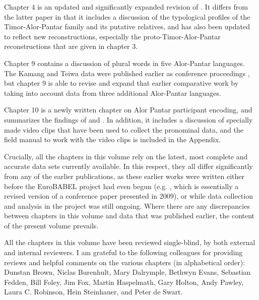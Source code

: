 \documentclass[output=paper]{LSP/langsci}
\begin{document}
	Chapter 4 is an updated and significantly expanded revision of \citet{RobinsonEtAl2012reassessing}. It differs from the latter paper in that it includes a discussion of the typological profiles of the Timor-Alor-Pantar family and its putative relatives, and has also been updated to reflect new reconstructions, especially the proto-Timor-Alor-Pantar reconstructions that are given in chapter 3. 
	
	Chapter 9 contains a discussion of plural words in five Alor-Pantar languages. The Kamang and Teiwa data were published earlier as conference proceedings \citep{SchapperEtAl2011plural}, but chapter 9 is able to revise and expand that earlier comparative work by taking into account data from three additional Alor-Pantar languages.
	
	Chapter 10 is a newly written chapter on Alor Pantar participant encoding, and summarizes the findings of \citet{FeddenEtAl2013} and \citet{FeddenEtAl2014}. In addition, it includes a discussion of specially made video clips that have been used to collect the pronominal data, and the field manual to work with the video clips is included in the Appendix.
	
	Crucially, all the chapters in this volume rely on the latest, most complete and accurate data sets currently available. In this respect, they all differ significantly from any of the earlier publications, as these earlier works were written either before the EuroBABEL project had even begun (e.g. \citet{HoltonEtAl2012}, which is essentially a revised version of a conference paper presented in 2009), or while data collection and analysis in the project was still ongoing. Where there are any discrepancies between chapters in this volume and data that was published earlier, the content of the present volume prevails.
	
	All the chapters in this volume have been reviewed single-blind, by both external and internal reviewers. I am grateful to the following colleagues for providing reviews and helpful comments on the various chapters (in alphabetical order): Dunstan Brown, Niclas Burenhult, Mary Dalrymple, Bethwyn Evans, Sebastian Fedden, Bill Foley, Jim Fox, Martin Haspelmath, Gary Holton, Andy Pawley, Laura C. Robinson, Hein Steinhauer, and Peter de Swart.
	
\printbibliography[heading=subbibliography,notkeyword=this]
\end{document}
